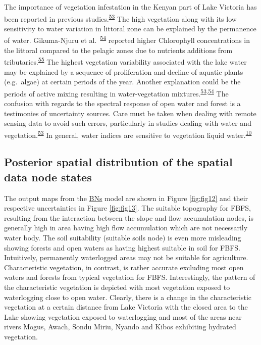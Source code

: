 \documentclass[12pt,oneside]{article}
\begin{document}
The importance of vegetation infestation in the Kenyan part of Lake Victoria has been reported in previous studies.\textsuperscript{\protect\hyperlink{ref-Cavalli_et_al_2009}{53}} The high vegetation along with its low sensitivity to water variation in littoral zone can be explained by the permanence of water. Gikuma-Njuru et al.~\textsuperscript{\protect\hyperlink{ref-Gikuma-Njuru_et_al_2005}{54}} reported higher Chlorophyll concentrations in the littoral compared to the pelagic zones due to nutrients additions from tributaries.\textsuperscript{\protect\hyperlink{ref-World_Bank_1996}{55}} The highest vegetation variability associated with the lake water may be explained by a sequence of proliferation and decline of aquatic plants (e.g.~algae) at certain periods of the year. Another explanation could be the periods of active mixing resulting in water-vegetation mixtures.\textsuperscript{\protect\hyperlink{ref-Cavalli_et_al_2009}{53},\protect\hyperlink{ref-Gikuma-Njuru_et_al_2005}{54}} The confusion with regards to the spectral response of open water and forest is a testimonies of uncertainty sources. Care must be taken when dealing with remote sensing data to avoid such errors, particularly in studies dealing with water and vegetation.\textsuperscript{\protect\hyperlink{ref-Cavalli_et_al_2009}{53}} In general, water indices are sensitive to vegetation liquid water.\textsuperscript{\protect\hyperlink{ref-Boschetti_et_al_2014}{10}}

\hypertarget{II5}{%
\subsection{Posterior spatial distribution of the spatial data node states}\label{II5}}

The output maps from the \href{https://en.wikipedia.org/wiki/Bayesian_network}{BNs} model are shown in Figure \ref{fig:fig12} and their respective uncertainties in Figure \ref{fig:fig13}. The suitable topography for FBFS, resulting from the interaction between the slope and flow accumulation nodes, is generally high in area having high flow accumulation which are not necessarily water body. The soil suitability (suitable soils node) is even more misleading showing forests and open waters as having highest suitable in soil for FBFS. Intuitively, permanently waterlogged areas may not be suitable for agriculture. Characteristic vegetation, in contrast, is rather accurate excluding most open waters and forests from typical vegetation for FBFS. Interestingly, the pattern of the characteristic vegetation is depicted with most vegetation exposed to waterlogging close to open water. Clearly, there is a change in the characteristic vegetation at a certain distance from Lake Victoria with the closed area to the Lake showing vegetation exposed to waterlogging and most of the areas near rivers Mogus, Awach, Sondu Miriu, Nyando and Kibos exhibiting hydrated vegetation.
\end{document}
